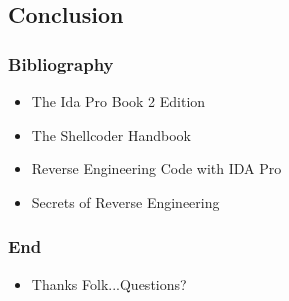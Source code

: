 \documentclass[]{beamer}
\begin{document}
\subsection{Conclusion}
\begin{frame}
  \frametitle{Bibliography}
  \begin{itemize}
  \item{The Ida Pro Book 2 Edition }
  \item{The Shellcoder Handbook}
  \item{Reverse Engineering Code with IDA Pro}
  \item{Secrets of Reverse Engineering}
  \end{itemize}
\end{frame}
\begin{frame}
  \frametitle{End}
  \begin{itemize}
  \item{Thanks Folk...Questions?}
  \end{itemize}
\end{frame}
\end{document}
